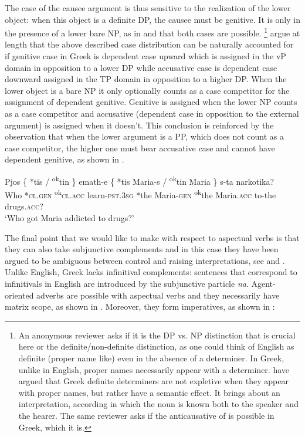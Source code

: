 \documentclass[output=paper]{langscibook}
\begin{document}
The case of the causee argument is thus sensitive to the realization of the lower object: 
when this object is a definite DP, the causee must be genitive.
It is only in the presence of a lower bare NP, as in  and   that both cases are possible.%
\footnote{An anonymous reviewer asks if it is the DP vs. NP distinction that is crucial here or the definite/non-definite distinction, 
    as one could think of English as definite (proper name like) even in the absence of a determiner. 
    In Greek, unlike in English, proper names necessarily appear with a determiner. 
    \citet{AlexopoulouFolli2011,AlexopoulouFolli2019} have argued that Greek definite determiners are not expletive when they appear with proper names, 
    but rather have a semantic effect. 
    It brings about an interpretation, according in which the noun is known both  to the speaker and the hearer. 
    The same reviewer asks if the anticausative of  is possible in Greek, which it is.\label{alexiadouftn:key:6}}
\citet{AnagnostopoulouSevdali2020} argue at length that the above described case distribution can be naturally accounted for 
if genitive case in Greek is dependent case upward which is assigned in the vP domain in opposition to a lower DP 
while accusative case is dependent case downward assigned in the TP domain in opposition to a higher DP.  
When the lower object is a bare NP it only optionally counts as a case competitor for the assignment of dependent genitive. 
Genitive is assigned when the lower NP counts as a case competitor 
and accusative (dependent case in opposition to the external argument) is assigned when it doesn’t. 
This conclusion is reinforced by the observation that when the lower argument is a PP, which does not count as a case competitor, 
the higher one must bear accusative case and cannot have dependent genitive, as shown in .

\ea%
    \label{alexiadouex:key:11}
    \gll Pjos \{ *tis / \textsuperscript{ok}tin \}  emath-e \{ *tis Maria-s / \textsuperscript{ok}tin Maria \} s-ta  narkotika?\\
    Who {} *\textsc{cl.gen} {} \textsuperscript{ok}\textsc{cl.acc} {} learn-\textsc{pst.3sg} {} *the Maria-\textsc{gen} {} \textsuperscript{ok}the Maria.\textsc{acc} {} to-the drugs.\textsc{acc}? \\
    \glt ‘Who got Maria addicted to drugs?’
\z 

The final point that we would like to make with respect to aspectual verbs is that 
they can also take subjunctive complements and in this case they have been argued to be ambiguous between control and raising interpretations, 
see \citet{alexiadouanagnostopoulou1999} and \citet{Roussou2009}. 
Unlike English, Greek lacks infinitival complements: 
sentences that correspond to infinitivals in English are introduced by the subjunctive particle \textit{na}. 
Agent-oriented adverbs are possible with aspectual verbs and they necessarily have matrix scope, as shown in . 
Moreover, they form imperatives, as shown in :
\end{document}
